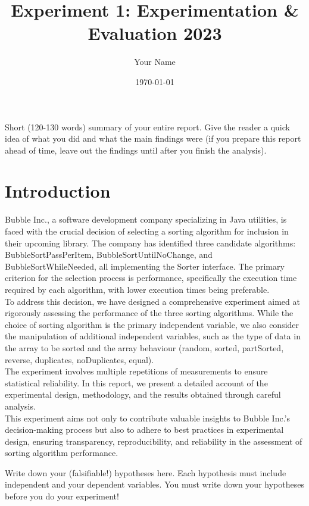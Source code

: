 \documentclass{article}
\title{Experiment 1: Experimentation \& Evaluation 2023}
\author{Your Name}
\date{\today}
\begin{document}
\maketitle

Short (120-130 words) summary of your entire report. Give the reader a quick idea of what you did and what the main findings were (if you prepare this report ahead of time, leave out the findings until after you finish the analysis).


\section{Introduction}
Bubble Inc., a software development company specializing in Java utilities, is faced with the crucial decision of selecting a sorting algorithm for inclusion in their upcoming library. The company has identified three candidate algorithms: BubbleSortPassPerItem, BubbleSortUntilNoChange, and BubbleSortWhileNeeded, all implementing the Sorter interface. The primary criterion for the selection process is performance, specifically the execution time required by each algorithm, with lower execution times being preferable.\\
To address this decision, we have designed a comprehensive experiment aimed at rigorously assessing the performance of the three sorting algorithms. While the choice of sorting algorithm is the primary independent variable, we also consider the manipulation of additional independent variables, such as the type of data in the array to be sorted and the array behaviour (random, sorted, partSorted, reverse, duplicates, noDuplicates, equal).\\
The experiment involves multiple repetitions of measurements to ensure statistical reliability. In this report, we present a detailed account of the experimental design, methodology, and the results obtained through careful analysis.\\
This experiment aims not only to contribute valuable insights to Bubble Inc.'s decision-making process but also to adhere to best practices in experimental design, ensuring transparency, reproducibility, and reliability in the assessment of sorting algorithm performance.


\begin{tcolorbox}[title=Hypotheses:, colback=white, colframe=black, arc=0pt, outer arc=0pt]
    Write down your (falsifiable!) hypotheses here. Each hypothesis must include independent and your dependent variables. You must write down your hypotheses before you do your experiment!
\end{tcolorbox}
\end{document}
